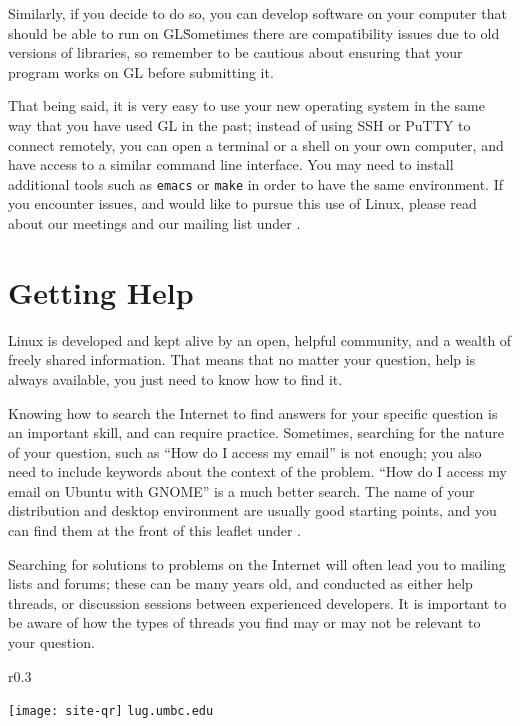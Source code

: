 \documentclass[11pt,notumble]{leaflet}
\begin{document}
Similarly, if you decide to do so, you can develop software on your computer
that should be able to run on GL\. Sometimes there are compatibility issues due
to old versions of libraries, so remember to be cautious about ensuring that
your program works on GL before submitting it.

That being said, it is very easy to use your new operating system in the same
way that you have used GL in the past; instead of using SSH or PuTTY to connect
remotely, you can open a terminal or a shell on your own computer, and have
access to a similar command line interface. You may need to install additional
tools such as \texttt{emacs} or \texttt{make} in order to have the same
environment. If you encounter issues, and would like to pursue this use of
Linux, please read about our meetings and our mailing list under
.

\section{Getting Help}
\label{section:getting-help}

Linux is developed and kept alive by an open, helpful community, and a wealth of
freely shared information. That means that no matter your question, help is
always available, you just need to know how to find it.

Knowing how to search the Internet to find answers for your specific question is
an important skill, and can require practice. Sometimes, searching for the
nature of your question, such as ``How do I access my email'' is not enough; you
also need to include keywords about the context of the problem. ``How do I
access my email on Ubuntu with GNOME'' is a much better search. The name of your
distribution and desktop environment are usually good starting points, and you
can find them at the front of this leaflet under .

Searching for solutions to problems on the Internet will often lead you to
mailing lists and forums; these can be many years old, and conducted as either
help threads, or discussion sessions between experienced developers. It is
important to be aware of how the types of threads you find may or may not be
relevant to your question.

\begin{wrapfigure}{r}{0.3\textwidth}
    \vspace{-3em}
    \begin{center}
        \texttt{[image: site-qr]}
        \vspace{-2em}
        \texttt{lug.umbc.edu}
    \end{center}
\end{wrapfigure}
\end{document}

